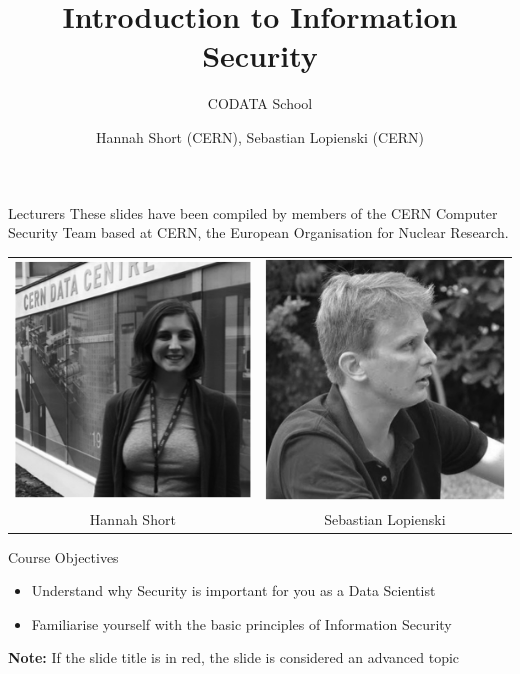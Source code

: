 \documentclass{beamer}
\author{Hannah Short (CERN), Sebastian Lopienski (CERN)}
\title{Introduction to Information Security}
\subtitle{CODATA School}
\begin{document}
\frontcover

\frame{\titlepage}

\begin{frame}{Lecturers}
These slides have been compiled by members of the CERN Computer Security Team based at CERN, the European Organisation for Nuclear Research.
\begin{center}
\begin{tabular}{ c c  }
 \includegraphics[width=0.2\linewidth]{lecturer1.png} & \includegraphics[width=0.2\linewidth]{Lecturer2.png}  \\ 
 Hannah Short & Sebastian Lopienski  \\  
\end{tabular}
\end{center}
\end{frame}

\frame{\tableofcontents}

\begin{frame}{Course Objectives}
	\begin{itemize}
		\item Understand why Security is important for you as a Data Scientist
		\item Familiarise yourself with the basic principles of Information Security
	\end{itemize}
\textbf{Note:} \newline
\textit{}{If the slide title is in {\color{red}red}, the slide is considered an advanced topic}
\end{frame}
\end{document}
